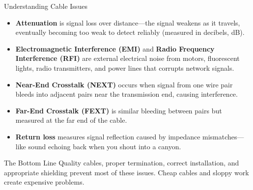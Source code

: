 \documentclass[aspectratio=169]{beamer}
\begin{document}
\begin{frame}{Understanding Cable Issues}
    \begin{itemize}
        \item \textbf{Attenuation} is signal loss over distance---the signal weakens as it travels, eventually becoming too weak to detect reliably (measured in decibels, dB).
        \item \textbf{Electromagnetic Interference (EMI)} and \textbf{Radio Frequency Interference (RFI)} are external electrical noise from motors, fluorescent lights, radio transmitters, and power lines that corrupts network signals.
        \item \textbf{Near-End Crosstalk (NEXT)} occurs when signal from one wire pair bleeds into adjacent pairs near the transmission end, causing interference.
        \item \textbf{Far-End Crosstalk (FEXT)} is similar bleeding between pairs but measured at the far end of the cable.
        \item \textbf{Return loss} measures signal reflection caused by impedance mismatches---like sound echoing back when you shout into a canyon.
    \end{itemize}
    
    \vspace{0.2cm}
    \begin{block}{The Bottom Line}
        Quality cables, proper termination, correct installation, and appropriate shielding prevent most of these issues. Cheap cables and sloppy work create expensive problems.
    \end{block}
\end{frame}
\end{document}
